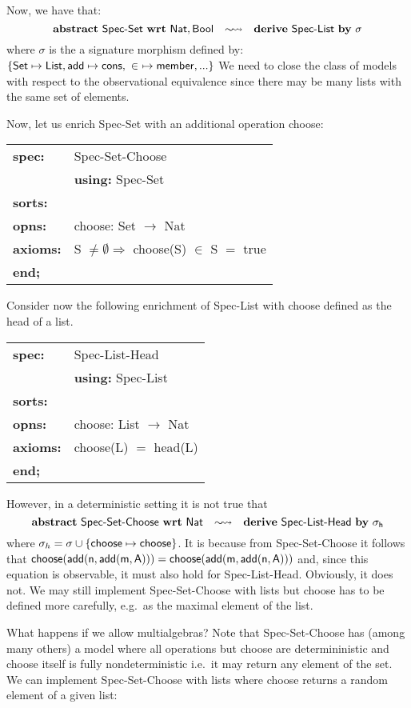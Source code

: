 \medskip
Now, we have that:
\[
{\rm \bf abstract}\ \mbox{\sf Spec-Set}\ {\rm \bf wrt}\ \sf Nat, Bool \quad \mbox{$\sim\!\leadsto$} \quad
{\rm \bf derive}\ \mbox{\sf Spec-List}\ {\rm \bf by}\ \sigma
\]
where $\sigma$ is the a signature morphism defined by: $\{{\sf Set
\mapsto List, add \mapsto cons, \ \in\ \mapsto member,...}\}$ We need
to close the class of models with respect to the observational
equivalence since there may be many lists with the same set of
elements.

Now, let us enrich {\sf Spec-Set} with an additional operation {\sf
choose}: 

\medskip 
\begin{tabular}{ll}
{\bf spec:}   & {\sf Spec-Set-Choose} \\
              & {\bf using:} {\sf Spec-Set}  \\
{\bf sorts:}  & \\
{\bf opns:}   & {\sf choose: Set $\rightarrow$ Nat} \\
{\bf axioms:} & {\sf S $\not= \emptyset \Rightarrow$ choose(S) $\in$ S
                 $=$ true} \\
{\bf end;}
\end{tabular} 

\medskip 
\noindent
Consider now the following enrichment of {\sf Spec-List} with {\sf
choose} defined as the head of a list.

\medskip 
\begin{tabular}{ll}
{\bf spec:}   & {\sf Spec-List-Head} \\
              & {\bf using:} {\sf Spec-List} \\
{\bf sorts:}  & \\
{\bf opns:}   & {\sf choose: List $\rightarrow$ Nat} \\
{\bf axioms:} & {\sf choose(L) $=$ head(L)} \\
{\bf end;}
\end{tabular}

\medskip
\noindent
However, in a deterministic setting it is not true that
\[
{\rm \bf abstract}\ \mbox{\sf Spec-Set-Choose}\ {\rm \bf wrt}\ \sf Nat \quad \mbox{$\sim\!\leadsto$} \quad
{\rm \bf derive}\ \mbox{\sf Spec-List-Head}\ {\rm \bf by}\ \sigma_h
\]
where $\sigma_h = \sigma \cup \{{\sf choose \mapsto choose}\}$.  It is
because from {\sf Spec-Set-Choose} it follows that ${\sf
choose(add(n,add(m,A))) = choose(add(m,add(n,A)))}$ and, since this
equation is observable, it must also hold for {\sf Spec-List-Head}.
Obviously, it does not.  We may still implement {\sf Spec-Set-Choose}
with lists but {\sf choose} has to be defined more carefully, e.g.\ as
the maximal element of the list.

What happens if we allow multialgebras? Note that {\sf
Spec-Set-Choose} has (among many others) a model where all operations
but {\sf choose} are determininistic and {\sf choose} itself is fully
nondeterministic i.e.\ it may return any element of the set. We can
implement {\sf Spec-Set-Choose} with lists where {\sf choose} returns
a random element of a given list:

